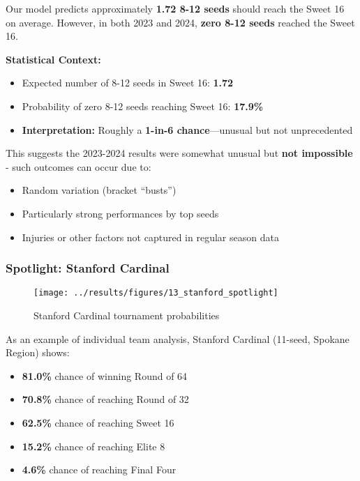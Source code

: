 \documentclass[
]{article}
\providecommand{\tightlist}{%
  \setlength{\itemsep}{0pt}\setlength{\parskip}{0pt}}
\begin{document}
Our model predicts approximately \textbf{1.72 8-12 seeds} should reach
the Sweet 16 on average. However, in both 2023 and 2024, \textbf{zero
8-12 seeds} reached the Sweet 16.

\textbf{Statistical Context:}

\begin{itemize}
\tightlist
\item
  Expected number of 8-12 seeds in Sweet 16: \textbf{1.72}
\item
  Probability of zero 8-12 seeds reaching Sweet 16: \textbf{17.9\%}
\item
  \textbf{Interpretation:} Roughly a \textbf{1-in-6 chance}---unusual
  but not unprecedented
\end{itemize}

This suggests the 2023-2024 results were somewhat unusual but
\textbf{not impossible} - such outcomes can occur due to:

\begin{itemize}
\tightlist
\item
  Random variation (bracket ``busts'')
\item
  Particularly strong performances by top seeds
\item
  Injuries or other factors not captured in regular season data
\end{itemize}

\subsubsection{Spotlight: Stanford
Cardinal}\label{spotlight-stanford-cardinal}

\begin{figure}

{\centering \texttt{[image: ../results/figures/13\_stanford\_spotlight]} 

}

\caption{Stanford Cardinal tournament probabilities}\label{fig:stanford-spotlight}
\end{figure}

As an example of individual team analysis, Stanford Cardinal (11-seed,
Spokane Region) shows:

\begin{itemize}
\tightlist
\item
  \textbf{81.0\%} chance of winning Round of 64
\item
  \textbf{70.8\%} chance of reaching Round of 32
\item
  \textbf{62.5\%} chance of reaching Sweet 16
\item
  \textbf{15.2\%} chance of reaching Elite 8
\item
  \textbf{4.6\%} chance of reaching Final Four
\end{itemize}
\end{document}
